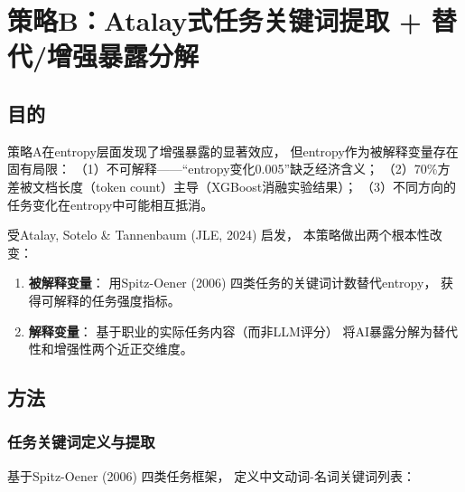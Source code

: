 \documentclass[12pt,a4paper]{ctexart}
\begin{document}
\section{策略B：Atalay式任务关键词提取 + 替代/增强暴露分解}
\label{sec:strategy_b}

\subsection{目的}

策略A在entropy层面发现了增强暴露的显著效应，
但entropy作为被解释变量存在固有局限：
（1）不可解释——``entropy变化0.005''缺乏经济含义；
（2）70\%方差被文档长度（token count）主导（XGBoost消融实验结果）；
（3）不同方向的任务变化在entropy中可能相互抵消。

受Atalay, Sotelo \& Tannenbaum (JLE, 2024) 启发，
本策略做出两个根本性改变：

\begin{enumerate}
\item \textbf{被解释变量}：
      用Spitz-Oener (2006) 四类任务的关键词计数替代entropy，
      获得可解释的任务强度指标。
\item \textbf{解释变量}：
      基于职业的实际任务内容（而非LLM评分）
      将AI暴露分解为替代性和增强性两个近正交维度。
\end{enumerate}

\subsection{方法}

\subsubsection{任务关键词定义与提取}

基于Spitz-Oener (2006) 四类任务框架，
定义中文动词-名词关键词列表：
\end{document}
